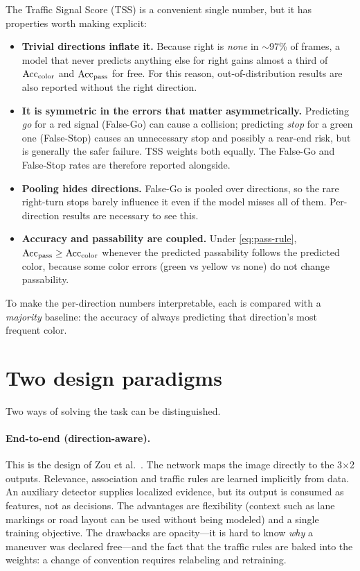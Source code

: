 The Traffic Signal Score (TSS) is a convenient single number, but it has properties worth making
explicit:
\begin{itemize}
  \item \textbf{Trivial directions inflate it.} Because right is \emph{none} in $\sim$97\% of frames, a
        model that never predicts anything else for right gains almost a third of $\mathrm{Acc}_{\mathrm{color}}$ and
        $\mathrm{Acc}_{\mathrm{pass}}$ for free. For this reason, out-of-distribution results are also reported without the
        right direction.
  \item \textbf{It is symmetric in the errors that matter asymmetrically.} Predicting \emph{go} for a
        red signal (False-Go) can cause a collision; predicting \emph{stop} for a green one (False-Stop)
        causes an unnecessary stop and possibly a rear-end risk, but is generally the safer failure.
        TSS weights both equally. The False-Go and False-Stop rates are therefore reported alongside.
  \item \textbf{Pooling hides directions.} False-Go is pooled over directions, so the rare
        right-turn stops barely influence it even if the model misses all of them. Per-direction
        results are necessary to see this.
  \item \textbf{Accuracy and passability are coupled.} Under \cref{eq:pass-rule}, $\mathrm{Acc}_{\mathrm{pass}}\ge\mathrm{Acc}_{\mathrm{color}}$
        whenever the predicted passability follows the predicted color, because some color errors
        (green vs yellow vs none) do not change passability.
\end{itemize}
To make the per-direction numbers interpretable, each is compared with a \emph{majority} baseline: the
accuracy of always predicting that direction's most frequent color.

\section{Two design paradigms}
\label{sec:prob-paradigms}

Two ways of solving the task can be distinguished.

\paragraph{End-to-end (direction-aware).} This is the design of Zou et al.~\cite{zou2026oneperception}.
The network maps the image directly to the 3$\times$2
outputs. Relevance, association and traffic rules are learned implicitly from data. An auxiliary
detector supplies localized evidence, but its output is consumed as features, not as decisions. The
advantages are flexibility (context such as lane markings or road layout can be used without being
modeled) and a single training objective. The drawbacks are opacity---it is hard to know \emph{why} a
maneuver was declared free---and the fact that the traffic rules are baked into the weights: a change
of convention requires relabeling and retraining.

